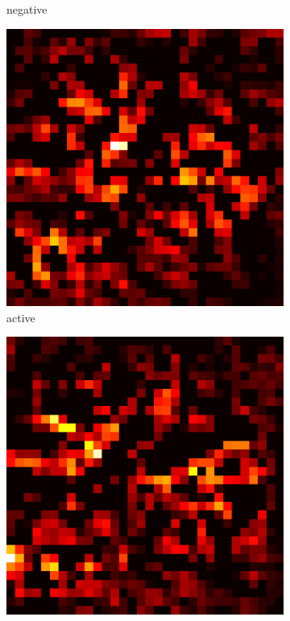 \documentclass[preprint,12pt]{elsarticle}
\begin{document}
\begin{figure}
\begin{subfigure}{0.14\textwidth}
        \caption{negative}
    \end{subfigure}
    \hfill
    \begin{subfigure}{0.14\textwidth}
        \centering
        \includegraphics[width=\linewidth]{../visualizations/examples/cifar10/cnn/active_saliency_map/7.png}
        \caption{active}
    \end{subfigure}
    \hfill
    \begin{subfigure}{0.14\textwidth}
        \centering
        \includegraphics[width=\linewidth]{../visualizations/examples/cifar10/cnn/inactive_saliency_map/7.png}

\end{subfigure}
\end{figure}
\end{document}

